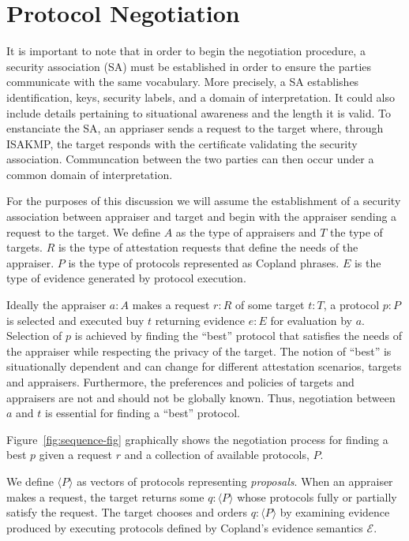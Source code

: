 \documentclass[sigconf,authordraft]{acmart}
\begin{document}
\section{Protocol Negotiation}

It is important to note that in order to begin the negotiation
procedure, a security association (SA) must be established in order to
ensure the parties communicate with the same vocabulary. More
precisely, a SA establishes identification, keys, security labels, and
a domain of interpretation. It could also include details pertaining
to situational awareness and the length it is valid. To enstanciate
the SA, an appriaser sends a request to the target where, through
ISAKMP, the target responds with the certificate validating the
security association. Communcation between the two parties can then
occur under a common domain of interpretation.

For the purposes of this discussion we will assume the establishment
of a security association between appraiser and target and begin with
the appraiser sending a request to the target.  We define $A$ as the
type of appraisers and $T$ the type of targets.  $R$ is the type of
attestation requests that define the needs of the appraiser.  $P$ is
the type of protocols represented as Copland phrases.  $E$ is the type
of evidence generated by protocol execution.

Ideally the appraiser $a:A$ makes a request $r:R$ of some target
$t:T$, a protocol $p:P$ is selected and executed buy $t$ returning
evidence $e:E$ for evaluation by $a$.  Selection of $p$ is achieved by
finding the ``best'' protocol that satisfies the needs of the
appraiser while respecting the privacy of the target. The notion of
``best'' is situationally dependent and can change for different
attestation scenarios, targets and appraisers.  Furthermore, the
preferences and policies of targets and appraisers are not and should
not be globally known.  Thus, negotiation between $a$ and $t$ is
essential for finding a ``best'' protocol.

Figure~\ref{fig:sequence-fig} graphically shows the negotiation
process for finding a best $p$ given a request $r$ and a collection of
available protocols, $P$.

We define $\langle P \rangle$ as vectors of protocols representing
\emph{proposals}.  When an appraiser makes a request, the target
returns some $q:\langle P \rangle$ whose protocols fully or partially
satisfy the request. The target chooses and orders
$q:\langle P\rangle$ by examining evidence produced by executing
protocols defined by Copland's evidence semantics $\mathcal{E}$.
\end{document}
